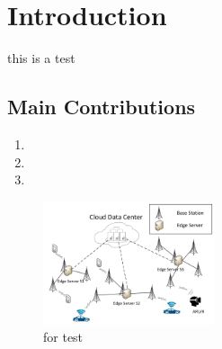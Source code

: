 \section{Introduction}\label{sec:introduction}
this is a test\cite{3gpp23402}

\subsection{Main Contributions}


\begin{enumerate}
    \item   
    \item   
    \item   
\end{enumerate}

\begin{figure}
    \begin{center}
        \includegraphics[width=0.45\textwidth]{graphics/edge_framework.pdf}
    \end{center}
    \caption{for test}
    \label{fig:test}
\end{figure}